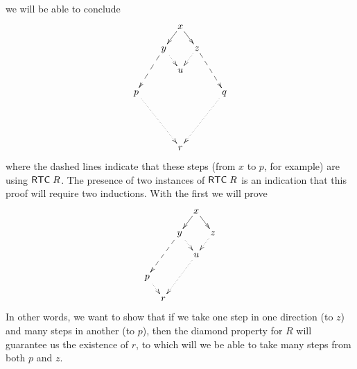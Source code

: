  we will be able to conclude\[\xymatrix @R=4mm @C=2mm {
& & & x \ar[dl] \ar[dr] & \\
& & y \ar@{.>}[dr] \ar@{-->}[ddll] & & z \ar@{.>}[dl] \ar@{-->}[ddrr] \\
& & & u \\
p \ar@{.>}[dddrrr] & & & & & & q \ar@{.>}[dddlll] \\ \\ \\
& & & r}\] where the dashed lines indicate that these steps (from $x$ to $p$,
for example) are using ${\sf RTC}\;R$.  The presence of two instances
of ${\sf RTC}\;R$ is an indication that this proof will require two
inductions.  With the first we will prove
\[\xymatrix @R=4mm @C=2mm {
& & & x \ar[dl] \ar[dr] & \\
& & y \ar@{.>}[dr] \ar@{-->}[ddll] & & z \ar@{.>}[dl] \\
& & & u \ar@{.>}[ddll] \\
p \ar@{.>}[dr] \\
& r}\]
In other words, we want to show that if we take one step in one
direction (to $z$) and many steps in another (to $p$), then the
diamond property for $R$ will guarantee us the existence of $r$,
to which will we be able to take many steps from both $p$ and $z$.

